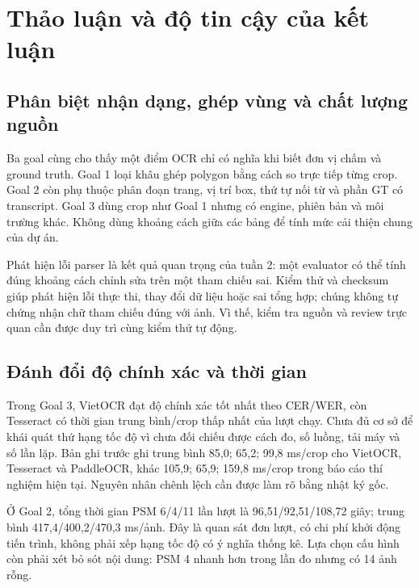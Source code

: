 \documentclass[11pt,a4paper]{article}
\begin{document}
\clearpage
\section{Thảo luận và độ tin cậy của kết luận}
\subsection{Phân biệt nhận dạng, ghép vùng và chất lượng nguồn}
Ba goal cùng cho thấy một điểm OCR chỉ có nghĩa khi biết đơn vị chấm và ground truth. Goal 1 loại khâu ghép polygon bằng cách so trực tiếp từng crop. Goal 2 còn phụ thuộc phân đoạn trang, vị trí box, thứ tự nối từ và phần GT có transcript. Goal 3 dùng crop như Goal 1 nhưng có engine, phiên bản và môi trường khác. Không dùng khoảng cách giữa các bảng để tính mức cải thiện chung của dự án.

Phát hiện lỗi parser là kết quả quan trọng của tuần 2: một evaluator có thể tính đúng khoảng cách chỉnh sửa trên một tham chiếu sai. Kiểm thử và checksum giúp phát hiện lỗi thực thi, thay đổi dữ liệu hoặc sai tổng hợp; chúng không tự chứng nhận chữ tham chiếu đúng với ảnh. Vì thế, kiểm tra nguồn và review trực quan cần được duy trì cùng kiểm thử tự động.

\subsection{Đánh đổi độ chính xác và thời gian}
Trong Goal 3, VietOCR đạt độ chính xác tốt nhất theo CER/WER, còn Tesseract có thời gian trung bình/crop thấp nhất của lượt chạy. Chưa đủ cơ sở để khái quát thứ hạng tốc độ vì chưa đối chiếu được cách đo, số luồng, tải máy và số lần lặp. Bản ghi trước ghi trung bình 85,0; 65,2; 99,8 ms/crop cho VietOCR, Tesseract và PaddleOCR, khác 105,9; 65,9; 159,8 ms/crop trong báo cáo thí nghiệm hiện tại. Nguyên nhân chênh lệch cần được làm rõ bằng nhật ký gốc.

Ở Goal 2, tổng thời gian PSM 6/4/11 lần lượt là 96,51/92,51/108,72 giây; trung bình 417,4/400,2/470,3 ms/ảnh. Đây là quan sát đơn lượt, có chi phí khởi động tiến trình, không phải xếp hạng tốc độ có ý nghĩa thống kê. Lựa chọn cấu hình còn phải xét bỏ sót nội dung: PSM 4 nhanh hơn trong lần đo nhưng có 14 ảnh rỗng.
\end{document}
